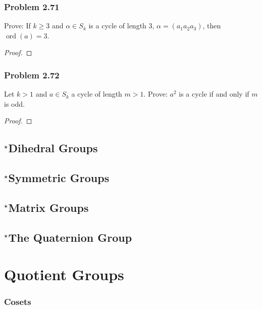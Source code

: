 \documentclass{amsbook}
\DeclareMathOperator{\ord}{\text{ord}}
\begin{document}
			\subsection*{Problem 2.71}
			\label{sub:problem_2_71}
			Prove: If $k \geq 3$ and $\alpha \in S_{k}$ is a cycle of length 3, $\alpha = (a_{1}a_{2}a_{3})$, then $\ord(a) = 3$.
			\begin{proof}
			\end{proof}

			\subsection*{Problem 2.72}
			\label{sub:problem_2_72}
			Let $k > 1$ and $a \in S_{k}$ a cycle of length $m > 1$.
			Prove: $a^{2}$ is a cycle if and only if $m$ is odd.
			\begin{proof}
			\end{proof}

		\section{$^{\star}$Dihedral Groups}
		\label{sec:dihedral_groups}

		\section{$^{\star}$Symmetric Groups}
		\label{sec:_star_symmetric_groups}

		\section{$^{\star}$Matrix Groups}
		\label{sec:_star_matrix_groups}

		\section{$^{\star}$The Quaternion Group}
		\label{sec:_star_the_quaternion_group}

	\chapter{Quotient Groups}
	\label{sec:quotient_groups}
		\subsection{Cosets}
		\label{sub:cosets}
\end{document}
